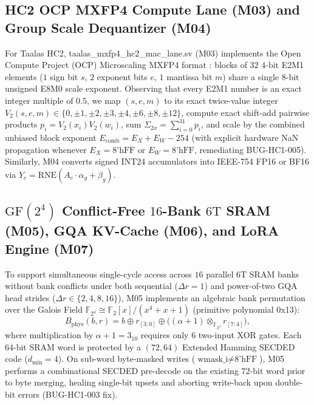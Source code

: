\documentclass[10pt,journal,compsoc]{IEEEtran}
\def\texttt#1{#1}%
\def\times{x}%
\begin{document}
\subsection{HC2 OCP \texttt{MXFP4} Compute Lane (\texttt{M03}) and Group Scale Dequantizer (\texttt{M04})}
For Taalas HC2, \texttt{taalas\_mxfp4\_hc2\_mac\_lane.sv} (\texttt{M03}) implements the Open Compute Project (OCP) Microscaling \texttt{MXFP4} format \cite{ocp2023mx}: blocks of $32$ $4\text{-bit}$ \texttt{E2M1} elements ($1$ sign bit $s$, $2$ exponent bits $e$, $1$ mantissa bit $m$) share a single $8\text{-bit}$ unsigned \texttt{E8M0} scale exponent. Observing that every \texttt{E2M1} number is an exact integer multiple of $0.5$, we map $(s,e,m)$ to its exact twice-value integer $V_2(s,e,m) \in \{0, \pm 1, \pm 2, \pm 3, \pm 4, \pm 6, \pm 8, \pm 12\}$, compute exact shift-add pairwise products $p_i = V_2(x_i) V_2(w_i)$, sum $\Sigma_{2\times} = \sum_{i=0}^{31} p_i$, and scale by the combined unbiased block exponent $E_{\text{comb}} = E_X + E_W - 254$ (with explicit hardware \texttt{NaN} propagation whenever $E_X = \text{\texttt{8'hFF}}$ or $E_W = \text{\texttt{8'hFF}}$, remediating \texttt{BUG-HC1-005}). Similarly, \texttt{M04} converts signed \texttt{INT24} accumulators into IEEE-754 \texttt{FP16} or \texttt{BF16} via $Y_c = \text{RNE}(A_c \cdot \alpha_g + \beta_g)$.

\subsection{$\text{GF}(2^4)$ Conflict-Free $16$-Bank $6\text{T}$ SRAM (\texttt{M05}), GQA KV-Cache (\texttt{M06}), and LoRA Engine (\texttt{M07})}
To support simultaneous single-cycle access across $16$ parallel $6\text{T}$ SRAM banks without bank conflicts under both sequential ($\Delta r = 1$) and power-of-two GQA head strides ($\Delta r \in \{2,4,8,16\}$), \texttt{M05} implements an algebraic bank permutation over the Galois Field $\mathbb{F}_{2^4} \cong \mathbb{F}_2[x]/(x^4+x+1)$ (primitive polynomial \texttt{0x13}):
\begin{equation}
B_{\text{phys}}(b, r) = b \oplus r_{[3:0]} \oplus \bigl((\alpha + 1) \otimes_{\mathbb{F}_{2^4}} r_{[7:4]}\bigr),
\label{eq:gf16_swizzle}
\end{equation}
where multiplication by $\alpha + 1 = 3_{10}$ requires only $6$ two-input XOR gates. Each $64\text{-bit}$ SRAM word is protected by a $(72,64)$ Extended Hamming SECDED code ($d_{\min}=4$). On sub-word byte-masked writes ($\text{\texttt{wmask\_i}} \neq \text{\texttt{8'hFF}}$), \texttt{M05} performs a combinational SECDED pre-decode on the existing $72\text{-bit}$ word prior to byte merging, healing single-bit upsets and aborting write-back upon double-bit errors (\texttt{BUG-HC1-003} fix).
\end{document}
